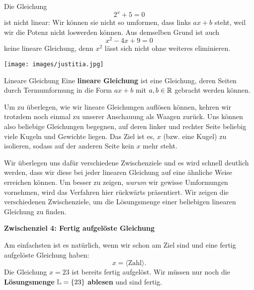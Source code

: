 \documentclass[../../main.tex]{subfiles}
\begin{document}
\begin{example}{}
    Die Gleichung 
    \[2^x+5=0\] 
    ist nicht linear: Wir können sie nicht so umformen, dass links $ax+b$ steht, weil wir die Potenz nicht loswerden können. Aus demselben Grund ist auch 
    \[x^2-4x+9=0\] 
    keine lineare Gleichung, denn $x^2$ lässt sich nicht ohne weiteres eliminieren.
\end{example}

\vfill

\begin{center}
    \texttt{[image: images/justitia.jpg]}
\end{center}

\newpage

\begin{definition}{Lineare Gleichung}
    Eine \textbf{lineare Gleichung} ist eine Gleichung, deren Seiten durch Termumformung in die Form $ax+b$ mit $a,b\in\mathbb{R}$ gebracht werden können.
\end{definition}

Um zu überlegen, wie wir lineare Gleichungen auflösen können, kehren wir trotzdem noch einmal zu unserer Anschauung als Waagen zurück. Uns können also beliebige Gleichungen begegnen, auf deren linker und rechter Seite beliebig viele Kugeln und Gewichte liegen. Das Ziel ist es, $x$ (bzw. eine Kugel) zu isolieren, sodass auf der anderen Seite kein $x$ mehr steht.

Wir überlegen uns dafür verschiedene Zwischenziele und es wird schnell deutlich werden, dass wir diese bei jeder linearen Gleichung auf eine ähnliche Weise erreichen können. Um besser zu zeigen, \emph{warum} wir gewisse Umformungen vornehmen, wird das Verfahren hier rückwärts präsentiert. Wir zeigen die verschiedenen Zwischenziele, um die Lösungsmenge einer beliebigen linearen Gleichung zu finden.

\textbf{Zwischenziel 4: Fertig aufgelöste Gleichung}

Am einfachsten ist es natürlich, wenn wir schon am Ziel sind und eine fertig aufgelöste Gleichung haben: 
\[x=\langle \text{Zahl} \rangle.\]
Die Gleichung $x=23$ ist bereits fertig aufgelöst. Wir müssen nur noch die \textbf{Lösungsmenge} $\mathbb{L}=\{23\}$ \textbf{ablesen} und sind fertig.
\end{document}
